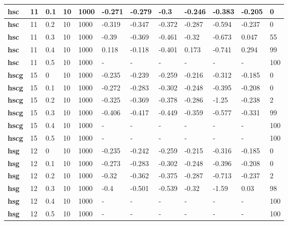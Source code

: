 \begin{longtable}[h]{|p{0.8cm}|p{1.5cm}|p{1cm}|p{1cm}|p{1cm}|p{1cm}|p{1cm}|p{1cm}|p{1cm}|p{1cm}|p{1cm}|p{1.5cm}|}
    \\ \hline
  \textbf{hsc } &  11         & 0.1 & 10 & 1000 & -0.271 & -0.279 &   -0.3 & -0.246 & -0.383 & -0.205 &   0
    \\ \hline
  \textbf{hsc } &  11         & 0.2 & 10 & 1000 & -0.319 & -0.347 & -0.372 & -0.287 & -0.594 & -0.237 &   0
    \\ \hline
  \textbf{hsc } &  11         & 0.3 & 10 & 1000 &  -0.39 & -0.369 & -0.461 &  -0.32 & -0.673 &  0.047 &  55
    \\ \hline
  \textbf{hsc } &  11         & 0.4 & 10 & 1000 &  0.118 & -0.118 & -0.401 &  0.173 & -0.741 &  0.294 &  99
    \\ \hline
  \textbf{hsc } &  11         & 0.5 & 10 & 1000 & - & - & - & - & - & - & 100
    \\ \hline
  \textbf{hscg} &  15         &   0 & 10 & 1000 & -0.235 & -0.239 & -0.259 & -0.216 & -0.312 & -0.185 &   0
    \\ \hline
  \textbf{hscg} &  15         & 0.1 & 10 & 1000 & -0.272 & -0.283 & -0.302 & -0.248 & -0.395 & -0.208 &   0
    \\ \hline
  \textbf{hscg} &  15         & 0.2 & 10 & 1000 & -0.325 & -0.369 & -0.378 & -0.286 &  -1.25 & -0.238 &   2
    \\ \hline
  \textbf{hscg} &  15         & 0.3 & 10 & 1000 & -0.406 & -0.417 & -0.449 & -0.359 & -0.577 & -0.331 &  99
    \\ \hline
  \textbf{hscg} &  15         & 0.4 & 10 & 1000 & - & - & - & - & - & - & 100
    \\ \hline
  \textbf{hscg} &  15         & 0.5 & 10 & 1000 & - & - & - & - & - & - & 100
    \\ \hline
  \textbf{hsg } &  12         &   0 & 10 & 1000 & -0.235 & -0.242 & -0.259 & -0.215 & -0.316 & -0.185 &   0
    \\ \hline
  \textbf{hsg } &  12         & 0.1 & 10 & 1000 & -0.273 & -0.283 & -0.302 & -0.248 & -0.396 & -0.208 &   0
    \\ \hline
  \textbf{hsg } &  12         & 0.2 & 10 & 1000 &  -0.32 & -0.362 & -0.375 & -0.287 & -0.713 & -0.237 &   2
    \\ \hline
  \textbf{hsg } &  12         & 0.3 & 10 & 1000 &   -0.4 & -0.501 & -0.539 &  -0.32 &  -1.59 &   0.03 &  98
    \\ \hline
  \textbf{hsg } &  12         & 0.4 & 10 & 1000 & - & - & - & - & - & - & 100
    \\ \hline
  \textbf{hsg } &  12         & 0.5 & 10 & 1000 & - & - & - & - & - & - & 100
    \\ \hline
 \end{longtable}
